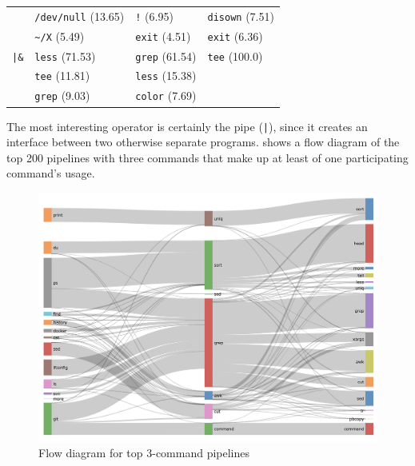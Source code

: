 \begin{table}
\begin{tabular}{ll|l|l}
             & \verb|/dev/null| {\small (\num{13.65})} & \verb|!| {\small (\num{6.95})} & \verb|disown| {\small (\num{7.51})} \\
             & \verb|~/X| {\small (\num{5.49})} & \verb|exit| {\small (\num{4.51})} & \verb|exit| {\small (\num{6.36})} \\    
    \midrule
    \verb!|&! & \verb|less| {\small (\num{71.53})} & \verb|grep| {\small (\num{61.54})} & \verb|tee| {\small (\num{100.0})} \\
             & \verb|tee| {\small (\num{11.81})}  & \verb|less| {\small (\num{15.38})} &  \\
             & \verb|grep| {\small (\num{9.03})} & \verb|color| {\small (\num{7.69})} &  \\
    \midrule
\end{tabular}
\end{table}

The most interesting operator is certainly the pipe (\verb!|!), since it creates an interface between two otherwise separate programs.
 shows a flow diagram of the top 200 pipelines with three commands that make up at least  of one participating command's usage.

\begin{figure}
    \centering    
    \includegraphics[width=\columnwidth]{flow.png}
    \caption{Flow diagram for top 3-command pipelines}
    \label{fig:flow}
\end{figure}
